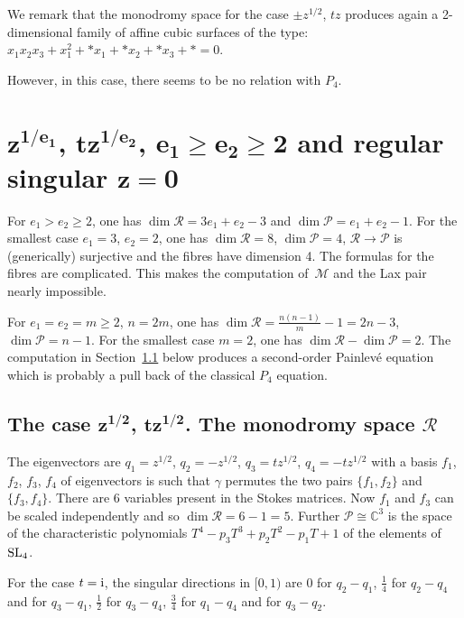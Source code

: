 \documentclass[10pt,a4paper]{amsart}
\numberwithin{equation}{section}
\begin{document}
We remark that the monodromy space for the
case $\pm z^{1/2}$, $tz$ produces again a 2-dimensional family of affine cubic surfaces of the type:
$x_1x_2x_3+x_1^2+*x_1+*x_2+*x_3+*=0$.

However, in this case, there seems to be no relation with $P_4$.

 \section[e1-th root of z, t times e2-th root of z, e1 at least e2 at least 2 and regular singular z=0]{ $\boldsymbol{z^{1/e_1}}$, $\boldsymbol{tz^{1/e_2}}$, $\boldsymbol{e_1\geq e_2\geq 2}$ and regular singular $\boldsymbol{z=0}$}\label{five}

 For $e_1>e_2\geq 2$, one has $\dim \mathcal{R}=3e_1+e_2-3$ and $\dim \mathcal{P}=e_1+e_2-1$. For the smallest case $e_1=3$, $e_2=2$,
 one has $\dim \mathcal{R}=8$, $\dim \mathcal{P}=4$, $\mathcal{R}\rightarrow \mathcal{P}$ is
(generically) surjective and the fibres have dimension 4. The formulas for the fibres are
complicated. This makes the computation of~$\mathcal{M}$ and the Lax pair nearly impossible.

For $e_1=e_2=m\geq 2$, $ n=2m$, one has $\dim \mathcal{R}=\frac{n(n-1)}{m}-1=2n-3$, $\dim \mathcal{P}=n-1$.
For the smallest case $m=2$, one has $\dim \mathcal{R}-\dim \mathcal{P}=2$. The computation in Section~\ref{5.1} below produces a
second-order Painlev\'e equation which is probably a pull back of the classical $P_4$ equation.

\subsection[The case sqrt(z), t*sqrt(z). The monodromy space R]{The case $\boldsymbol{z^{1/2}}$, $\boldsymbol{tz^{1/2}}$. The monodromy space $\boldsymbol{\mathcal{R}}$}\label{5.1}

 The eigenvectors are $q_1=z^{1/2}$, $q_2=-z^{1/2}$, $q_3=tz^{1/2}$, $q_4=-tz^{1/2}$ with a basis $f_1$, $f_2$, $f_3$, $f_4$
 of eigenvectors is such that $\gamma$ permutes the two pairs $\{f_1,f_2\}$ and $\{f_3,f_4\}$. There are 6 variables present in the Stokes matrices. Now $f_1$ and $f_3$ can be scaled independently and so $\dim \mathcal{R}=6-1=5$. Further
 $\mathcal{P}\cong \mathbb{C}^3$ is the space of the characteristic polynomials $T^4-p_3T^3+p_2T^2-p_1T+1$ of
 the elements of ${\rm SL}_4$.

For the case $t={\rm i}$, the singular directions in $[0,1)$ are $0$ for $q_2-q_1$, $\frac{1}{4}$ for $q_2-q_4$ and for $q_3-q_1$,
$\frac{1}{2}$ for $q_3-q_4$, $\frac{3}{4}$ for $q_1-q_4$ and for $q_3-q_2$.
\end{document}
